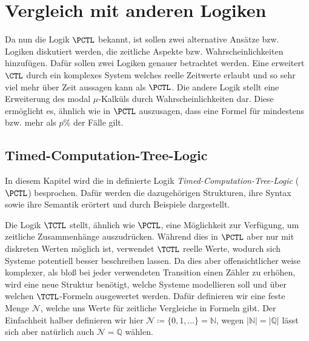 \section{Vergleich mit anderen Logiken}
\label{ChapVerwandt}

Da nun die Logik $\PCTL$ bekannt, ist sollen zwei alternative Ansätze bzw. Logiken diskutiert werden, die zeitliche Aspekte bzw. Wahrscheinlichkeiten hinzufügen.
Dafür sollen zwei Logiken genauer betrachtet werden.
Eine erweitert $\CTL$ durch ein komplexes System welches reelle Zeitwerte erlaubt und so sehr viel mehr über Zeit aussagen kann als $\PCTL$.
Die andere Logik stellt eine Erweiterung des modal $\mu$-Kalküls durch Wahrscheinlichkeiten dar.
Diese ermöglicht es, ähnlich wie in $\PCTL$ auszusagen, dass eine Formel für mindestens bzw. mehr als $p\%$ der Fälle gilt.

\subsection{Timed-Computation-Tree-Logic}

In diesem Kapitel wird die in \cite{alur1990model} definierte Logik \textit{Timed-Computation-Tree-Logic} ($\PCTL$) besprochen. Dafür werden die dazugehörigen Strukturen, ihre Syntax sowie ihre Semantik erörtert und durch Beispiele dargestellt.

Die Logik $\TCTL$ stellt, ähnlich wie $\PCTL$, eine Möglichkeit zur Verfügung, um zeitliche Zusammenhänge auszudrücken.
Während dies in $\PCTL$ aber nur mit diskreten Werten möglich ist, verwendet $\TCTL$ reelle Werte, wodurch sich Systeme potentiell besser beschreiben lassen.
Da dies aber offensichtlicher weise komplexer, als bloß bei jeder verwendeten Transition einen Zähler zu erhöhen, wird eine neue Struktur benötigt, welche Systeme modellieren soll und über welchen $\TCTL$-Formeln ausgewertet werden.
Dafür definieren wir eine feste Menge $\mathcal{N}$, welche uns Werte für zeitliche Vergleiche in Formeln gibt.
Der Einfachheit halber definieren wir hier $\mathcal{N}\coloneqq\{0,1,\dots\}=\mathbb{N}$, wegen $\vert\mathbb{N}\vert=\vert\mathbb{Q}\vert$ lässt sich aber natürlich auch $\mathcal{N}=\mathbb{Q}$ wählen. \cite{alur1990model}

